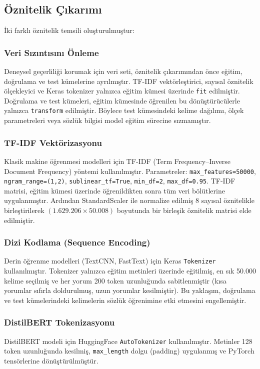 \documentclass[conference]{IEEEtran}
\begin{document}
\subsection{Öznitelik Çıkarımı}

İki farklı öznitelik temsili oluşturulmuştur:

\subsubsection{Veri Sızıntısını Önleme}
Deneysel geçerliliği korumak için veri seti, öznitelik çıkarımından önce eğitim, doğrulama ve test kümelerine ayrılmıştır. TF-IDF vektörleştirici, sayısal öznitelik ölçekleyici ve Keras tokenizer yalnızca eğitim kümesi üzerinde \texttt{fit} edilmiştir. Doğrulama ve test kümeleri, eğitim kümesinde öğrenilen bu dönüştürücülerle yalnızca \texttt{transform} edilmiştir. Böylece test kümesindeki kelime dağılımı, ölçek parametreleri veya sözlük bilgisi model eğitim sürecine sızmamıştır.

\subsubsection{TF-IDF Vektörizasyonu}
Klasik makine öğrenmesi modelleri için TF-IDF (Term Frequency--Inverse Document Frequency) yöntemi kullanılmıştır. Parametreler: \texttt{max\_features=50000}, \texttt{ngram\_range=(1,2)}, \texttt{sublinear\_tf=True}, \texttt{min\_df=2}, \texttt{max\_df=0.95}. TF-IDF matrisi, eğitim kümesi üzerinde öğrenildikten sonra tüm veri bölütlerine uygulanmıştır. Ardından StandardScaler ile normalize edilmiş 8 sayısal öznitelikle birleştirilerek $(1.629.206 \times 50.008)$ boyutunda bir birleşik öznitelik matrisi elde edilmiştir.

\subsubsection{Dizi Kodlama (Sequence Encoding)}
Derin öğrenme modelleri (TextCNN, FastText) için Keras \texttt{Tokenizer} kullanılmıştır. Tokenizer yalnızca eğitim metinleri üzerinde eğitilmiş, en sık 50.000 kelime seçilmiş ve her yorum 200 token uzunluğunda sabitlenmiştir (kısa yorumlar sıfırla doldurulmuş, uzun yorumlar kesilmiştir). Bu yaklaşım, doğrulama ve test kümelerindeki kelimelerin sözlük öğrenimine etki etmesini engellemiştir.

\subsubsection{DistilBERT Tokenizasyonu}
DistilBERT modeli için HuggingFace \texttt{AutoTokenizer} kullanılmıştır. Metinler 128 token uzunluğunda kesilmiş, \texttt{max\_length} dolgu (padding) uygulanmış ve PyTorch tensörlerine dönüştürülmüştür.
\end{document}
